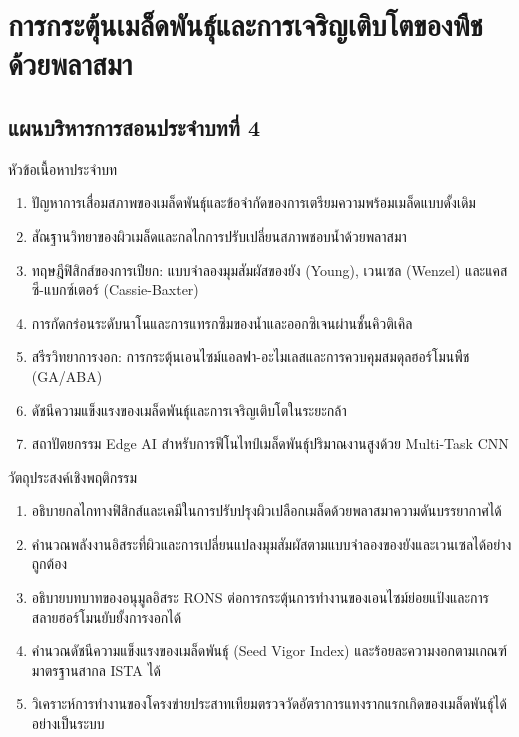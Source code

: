 \chapter{การกระตุ้นเมล็ดพันธุ์และการเจริญเติบโตของพืชด้วยพลาสมา}
\label{chap:ch04}


\vspace*{-6pt}
\section*{แผนบริหารการสอนประจำบทที่ 4}

\begin{planbox}{หัวข้อเนื้อหาประจำบท}
\begin{enumerate}
    \item ปัญหาการเสื่อมสภาพของเมล็ดพันธุ์และข้อจำกัดของการเตรียมความพร้อมเมล็ดแบบดั้งเดิม
    \item สัณฐานวิทยาของผิวเมล็ดและกลไกการปรับเปลี่ยนสภาพชอบน้ำด้วยพลาสมา
    \item ทฤษฎีฟิสิกส์ของการเปียก: แบบจำลองมุมสัมผัสของยัง (Young), เวนเซล (Wenzel) และแคสซี-แบกซ์เตอร์ (Cassie-Baxter)
    \item การกัดกร่อนระดับนาโนและการแทรกซึมของน้ำและออกซิเจนผ่านชั้นคิวติเคิล
    \item สรีรวิทยาการงอก: การกระตุ้นเอนไซม์แอลฟา-อะไมเลสและการควบคุมสมดุลฮอร์โมนพืช (GA/ABA)
    \item ดัชนีความแข็งแรงของเมล็ดพันธุ์และการเจริญเติบโตในระยะกล้า
    \item สถาปัตยกรรม Edge AI สำหรับการฟีโนไทป์เมล็ดพันธุ์ปริมาณงานสูงด้วย Multi-Task CNN
\end{enumerate}
\end{planbox}

\begin{planbox}{วัตถุประสงค์เชิงพฤติกรรม}
\begin{enumerate}
    \item อธิบายกลไกทางฟิสิกส์และเคมีในการปรับปรุงผิวเปลือกเมล็ดด้วยพลาสมาความดันบรรยากาศได้
    \item คำนวณพลังงานอิสระที่ผิวและการเปลี่ยนแปลงมุมสัมผัสตามแบบจำลองของยังและเวนเซลได้อย่างถูกต้อง
    \item อธิบายบทบาทของอนุมูลอิสระ RONS ต่อการกระตุ้นการทำงานของเอนไซม์ย่อยแป้งและการสลายฮอร์โมนยับยั้งการงอกได้
    \item คำนวณดัชนีความแข็งแรงของเมล็ดพันธุ์ (Seed Vigor Index) และร้อยละความงอกตามเกณฑ์มาตรฐานสากล ISTA ได้
    \item วิเคราะห์การทำงานของโครงข่ายประสาทเทียมตรวจวัดอัตราการแทงรากแรกเกิดของเมล็ดพันธุ์ได้อย่างเป็นระบบ
\end{enumerate}
\end{planbox}

